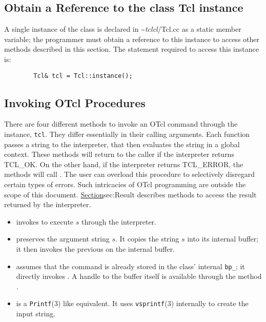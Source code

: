 \subsection{Obtain a Reference to the class Tcl instance}
\label{sec:instance}

A single instance of the class is declared in \textasciitilde\emph{tclcl}/{Tcl.cc}
as a static member variable;
the programmer must obtain a reference to this instance
to access other methods described in this section.
The statement required to access this instance is:
\begin{verbatim}
        Tcl& tcl = Tcl::instance();
\end{verbatim}

\subsection{Invoking OTcl Procedures}
\label{sec:Invoke}
There are four different methods to invoke an OTcl command
through the instance, {\tt tcl}.
They differ essentially in their calling arguments.
Each function passes a string to the interpreter,
that then evaluates the string in a global context.
These methods will return to the caller if the interpreter returns TCL\_OK.
On the other hand, if the interpreter returns TCL\_ERROR,
the methods will call .
The user can overload this procedure to selectively disregard
certain types of errors.
Such intricacies of OTcl programming are outside the
scope of this document.
\href{The next section}{Section}{sec:Result}
describes methods to access the result returned by the interpreter.
\begin{itemize}\itemsep0pt
\item {}
  invokes  to execute $s$ through the interpreter.

\item {}
  preserves the argument string $s$.
  It copies the string $s$ into its internal buffer;
  it then invokes the previous  on the internal buffer.

\item {}
  assumes that the command is already stored in the class' internal
  {\tt bp\_}; it directly invokes .
  A handle to the buffer itself is available through the method
  .

\item
  is a {\tt Printf}(3) like equivalent.
  It uses {\tt vsprintf}(3) internally to create the input string.
\end{itemize}
